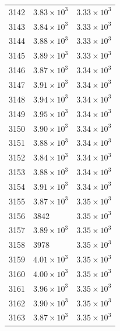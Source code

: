 \begin{table}[H]
\begin{tabular}{lll}
3142 & $\displaystyle 3.83 \times 10^{3}$ & $\displaystyle 3.33 \times 10^{3}$ \\
3143 & $\displaystyle 3.84 \times 10^{3}$ & $\displaystyle 3.33 \times 10^{3}$ \\
3144 & $\displaystyle 3.88 \times 10^{3}$ & $\displaystyle 3.33 \times 10^{3}$ \\
3145 & $\displaystyle 3.89 \times 10^{3}$ & $\displaystyle 3.33 \times 10^{3}$ \\
3146 & $\displaystyle 3.87 \times 10^{3}$ & $\displaystyle 3.34 \times 10^{3}$ \\
3147 & $\displaystyle 3.91 \times 10^{3}$ & $\displaystyle 3.34 \times 10^{3}$ \\
3148 & $\displaystyle 3.94 \times 10^{3}$ & $\displaystyle 3.34 \times 10^{3}$ \\
3149 & $\displaystyle 3.95 \times 10^{3}$ & $\displaystyle 3.34 \times 10^{3}$ \\
3150 & $\displaystyle 3.90 \times 10^{3}$ & $\displaystyle 3.34 \times 10^{3}$ \\
3151 & $\displaystyle 3.88 \times 10^{3}$ & $\displaystyle 3.34 \times 10^{3}$ \\
3152 & $\displaystyle 3.84 \times 10^{3}$ & $\displaystyle 3.34 \times 10^{3}$ \\
3153 & $\displaystyle 3.88 \times 10^{3}$ & $\displaystyle 3.34 \times 10^{3}$ \\
3154 & $\displaystyle 3.91 \times 10^{3}$ & $\displaystyle 3.34 \times 10^{3}$ \\
3155 & $\displaystyle 3.87 \times 10^{3}$ & $\displaystyle 3.35 \times 10^{3}$ \\
3156 & 3842 & $\displaystyle 3.35 \times 10^{3}$ \\
3157 & $\displaystyle 3.89 \times 10^{3}$ & $\displaystyle 3.35 \times 10^{3}$ \\
3158 & 3978 & $\displaystyle 3.35 \times 10^{3}$ \\
3159 & $\displaystyle 4.01 \times 10^{3}$ & $\displaystyle 3.35 \times 10^{3}$ \\
3160 & $\displaystyle 4.00 \times 10^{3}$ & $\displaystyle 3.35 \times 10^{3}$ \\
3161 & $\displaystyle 3.96 \times 10^{3}$ & $\displaystyle 3.35 \times 10^{3}$ \\
3162 & $\displaystyle 3.90 \times 10^{3}$ & $\displaystyle 3.35 \times 10^{3}$ \\
3163 & $\displaystyle 3.87 \times 10^{3}$ & $\displaystyle 3.35 \times 10^{3}$ \\

\end{tabular}
\end{table}
